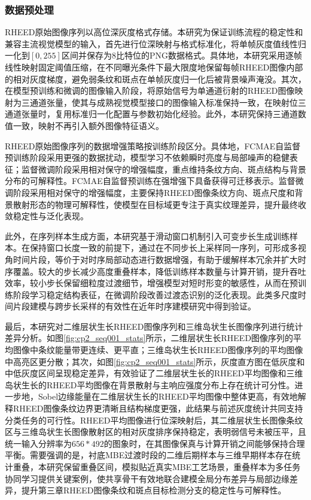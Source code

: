 \subsubsection{数据预处理}
RHEED原始图像序列以高位深灰度格式存储。本研究为保证训练流程的稳定性和兼容主流视觉模型的输入，首先进行位深映射与格式标准化，将单帧灰度值线性归一化到\([0,255]\)区间并保存为8比特位的PNG数据格式。具体地，本研究采用逐帧线性映射固定阈值压缩，在不同曝光条件下最大限度地保留每帧RHEED图像内部的相对灰度梯度，避免弱条纹和斑点在单帧灰度归一化后被背景噪声淹没。其次，在模型预训练和微调的图像输入阶段，将原始信号为单通道衍射的RHEED图像映射为三通道张量，使其与成熟视觉模型接口的图像输入标准保持一致，在映射位三通道张量时，复用标准归一化配置与参数初始化经验。此外，本研究保持三通道数值一致，映射不再引入额外图像特征语义。

RHEED原始图像序列的数据增强策略按训练阶段区分。具体地，FCMAE自监督预训练阶段采用更强的数据扰动，模型学习不依赖瞬时亮度与局部噪声的稳健表征；监督微调阶段采用相对保守的增强幅度，重点维持条纹方向、斑点结构与背景分布的可解释性。FCMAE自监督预训练在强增强下具备获得可迁移表示。监督微调阶段采用相对保守的增强幅度，主要保持RHEED图像条纹方向、斑点尺度和背景散射形态的物理可解释性，使模型在目标域更专注于真实纹理差异，提升最终收敛稳定性与泛化表现。

此外，在序列样本生成方面，本研究基于滑动窗口机制引入可变步长生成训练样本。在保持窗口长度一致的前提下，通过在不同步长上采样同一序列，可形成多视角时间片段，等价于对时序局部动态进行数据增强，有助于缓解样本冗余并扩大时序覆盖。较大的步长减少高度重叠样本，降低训练样本数量与计算开销，提升吞吐效率，较小步长保留细粒度过渡细节，增强模型对短时形变的敏感性，从而在预训练阶段学习稳定结构表征，在微调阶段改善过渡态识别的泛化表现。此类多尺度时间片段建模与跨步长采样的有效性在近年时序建模研究中得到验证。

最后，本研究对二维层状生长RHEED图像序列和三维岛状生长图像序列进行统计差异分析。如图\ref{fig:cp2_seq001_stats}所示，二维层状生长RHEED图像序列的平均图像中条纹能量带更连续、更平直；三维岛状生长RHEED图像序列的平均图像中高亮区更分散；其次，如图\ref{fig:cp2_seq001_stats}所示，灰度直方图在低灰度和中低灰度区间呈现稳定差异，有效验证了二维层状生长的RHEED平均图像和三维岛状生长的RHEED平均图像在背景散射与主响应强度分布上存在统计可分性。进一步地，Sobel边缘能量在二维层状生长的RHEED平均图像中整体更高，有效地解释RHEED图像条纹边界更清晰且结构梯度更强，此结果与前述灰度统计共同支持分类任务的可行性。RHEED平均图像进行位深映射后，其二维层状生长图像条纹区与三维岛状生长图像散射区的相对灰度排序保持稳定，表明弱信号未被压平，且统一输入分辨率为$656\ast 492$的图象时，在其图像保真与计算开销之间能够保持合理平衡。需要强调的是，衬底MBE过渡时段的二维后期样本与三维早期样本存在统计重叠，本研究保留重叠区间，模拟贴近真实MBE工艺场景，重叠样本为多任务协同学习提供关键案例，使共享骨干有效地联合建模全局分布差异与局部边缘差异，提升第三章RHEED图像条纹和斑点目标检测分支的稳定性与可解释性。

